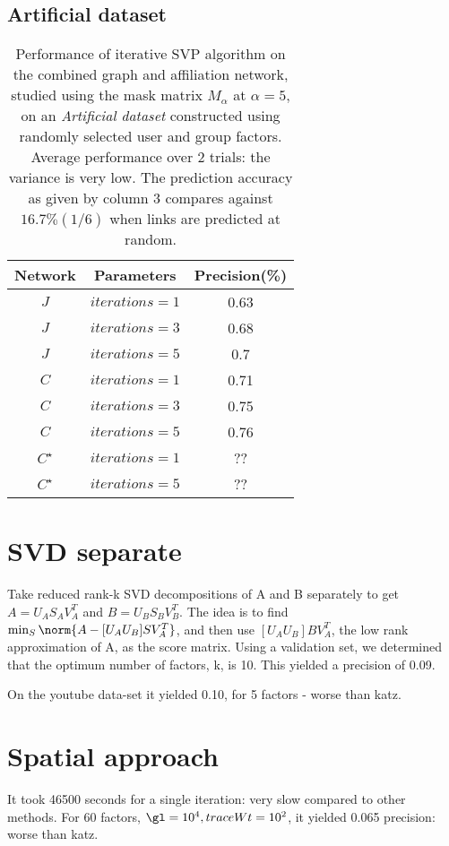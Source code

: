 \documentclass{report}
\begin{document}
\subsection{Artificial dataset}
\begin{table*}
\centering
\begin{tabular}{| c | c | c |} \hline
Network&Parameters&Precision(\%)\\ \hline
$J$ & $iterations = 1$ & 0.63\\ \hline
$J$ & $iterations = 3$ & 0.68\\ \hline
$J$ & $iterations = 5$ &  0.7\\ \hline
$C$ & $iterations = 1$ & 0.71\\ \hline
$C$ & $iterations = 3$ & 0.75\\ \hline
$C$ & $iterations = 5$ & 0.76\\ \hline
$C^{\star}$ & $iterations = 1$ & ??\\ \hline
$C^{\star}$ & $iterations = 5$ & ??\\ \hline
\end{tabular}
\caption{Performance of iterative SVP algorithm on the combined graph and affiliation network, studied using the mask matrix $M_{\alpha}$ at $\alpha = 5$, on an \textit{Artificial dataset} constructed using randomly selected user and group factors. Average performance over 2 trials: the variance is very low. The prediction accuracy as given by column 3 compares against $16.7\% (1/6)$ when links are predicted at random.}
\end{table*}


\section{SVD separate}
Take reduced rank-k SVD decompositions of A and B separately to get $A = U_A S_A V_A^{T}$ and $B = U_B S_B V_B^{T}$. The idea is to find $\min_S \norm{A - [U_A U_B] S V_A^{T}}$, and then use $[U_A U_B] B V_A^{T}$, the low rank approximation of A, as the score matrix. Using a validation set, we determined that the optimum number of factors, k, is 10. This yielded a precision of 0.09.

On the youtube data-set it yielded 0.10, for 5 factors - worse than katz.

\section{Spatial approach}
It took 46500 seconds for a single iteration: very slow compared to other methods. For 60 factors, $\gl = 10^4, traceWt = 10^2$, it yielded 0.065 precision: worse than katz.
\end{document}
